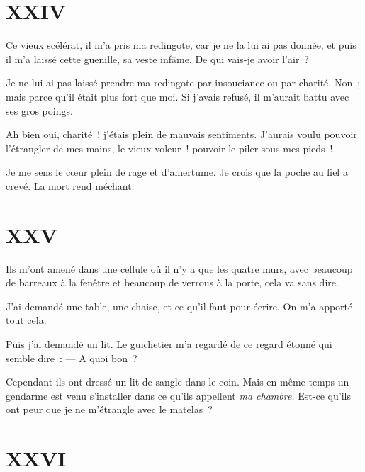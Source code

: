 \documentclass[french,twoside]{book} %
\begin{document}
 \section[{XXIV}]{XXIV}
\label{ch24}\renewcommand{\leftmark}{XXIV}

\noindent Ce vieux scélérat, il m’a pris ma redingote, car je ne la lui ai pas donnée, et puis il m’a laissé cette guenille, sa veste infâme. De qui vais-je avoir l’air ?\par
Je ne lui ai pas laissé prendre ma redingote par insouciance ou par charité. Non ; mais parce qu’il était plus fort que moi. Si j’avais refusé, il m’aurait battu avec ses gros poings.\par
Ah bien oui, charité ! j’étais plein de mauvais sentiments. J’aurais voulu pouvoir l’étrangler de mes mains, le vieux voleur ! pouvoir le piler sous mes pieds !\par
Je me sens le cœur plein de rage et d’amertume. Je crois que la poche au fiel a crevé. La mort rend méchant.
 \section[{XXV}]{XXV}
\label{ch25}\renewcommand{\leftmark}{XXV}

\noindent Ils m’ont amené dans une cellule où il n’y a que les quatre murs, avec beaucoup de barreaux à la fenêtre et beaucoup de verrous à la porte, cela va sans dire.\par
J’ai demandé une table, une chaise, et ce qu’il faut pour écrire. On m’a apporté tout cela.\par
Puis j’ai demandé un lit. Le guichetier m’a regardé de ce regard étonné qui semble dire : — A quoi bon ?\par
Cependant ils ont dressé un lit de sangle dans le coin. Mais en même temps un gendarme est venu s’installer dans ce qu’ils appellent \emph{ma chambre.} Est-ce qu’ils ont peur que je ne m’étrangle avec le matelas ?
 \section[{XXVI}]{XXVI}
\label{ch26}\renewcommand{\leftmark}{XXVI}
\end{document}
